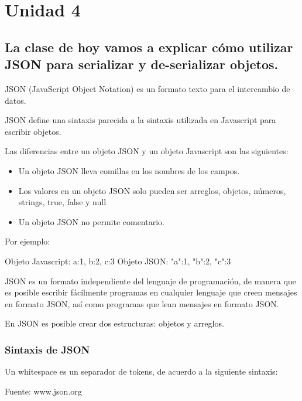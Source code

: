 \part{Unidad 4}


\chapter{La clase de hoy vamos a explicar cómo utilizar JSON para serializar y de-serializar objetos.}

JSON (JavaScript Object Notation) es un formato texto para el intercambio de datos.

JSON define una sintaxis parecida a la sintaxis utilizada en Javascript para escribir objetos.

Las diferencias entre un objeto JSON y un objeto Javascript son las siguientes:

\begin{itemize}
\item Un objeto JSON lleva comillas en los nombres de los campos.
\item Los valores en un objeto JSON solo pueden ser arreglos, objetos, números, strings, true, false y null
\item Un objeto JSON no permite comentario.
\end{itemize}

Por ejemplo:

\begin{SourceCode}
Objeto Javascript: {a:1, b:2, c:3}
Objeto JSON: {"a":1, "b":2, "c":3}
\end{SourceCode}

JSON es un formato independiente del lenguaje de programación, de manera que es posible escribir fácilmente programas en cualquier lenguaje que creen mensajes en formato JSON, así como programas que lean mensajes en formato JSON.

En JSON es posible crear dos estructuras: objetos y arreglos.

\section{Sintaxis de JSON}

\begin{SourceCode}
Un whitespace es un separador de tokens, de acuerdo a la siguiente sintaxis:

Fuente: www.json.org
\end{SourceCode}

